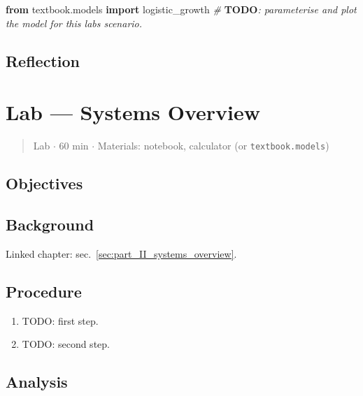 \documentclass[
]{article}
\newenvironment{Shaded}{}{}
\newcommand{\AlertTok}[1]{\textcolor[rgb]{1.00,0.00,0.00}{\textbf{#1}}}
\newcommand{\CommentTok}[1]{\textcolor[rgb]{0.38,0.63,0.69}{\textit{#1}}}
\newcommand{\ImportTok}[1]{\textcolor[rgb]{0.00,0.50,0.00}{\textbf{#1}}}
\newcommand{\NormalTok}[1]{#1}
\theoremstyle{plain}
\theoremstyle{definition}
\begin{document}
\begin{Shaded}
\begin{Highlighting}[]
\ImportTok{from}\NormalTok{ textbook.models }\ImportTok{import}\NormalTok{ logistic\_growth}
\CommentTok{\# }\AlertTok{TODO}\CommentTok{: parameterise and plot the model for this lab\textquotesingle{}s scenario.}
\end{Highlighting}
\end{Shaded}

\subsection{Reflection}\label{reflection-5}

\newpage

\section{Lab --- Systems
Overview}\label{sec:lab_part_II_systems_overview}

\begin{quote}
Lab \texorpdfstring{\ensuremath{\cdot}}{.} 60 min \texorpdfstring{\ensuremath{\cdot}}{.} Materials: notebook, calculator (or
\texttt{textbook.models})
\end{quote}

\subsection{Objectives}\label{objectives-6}

\subsection{Background}\label{background-6}

Linked chapter: sec.~\ref{sec:part_II_systems_overview}.

\subsection{Procedure}\label{procedure-6}

\begin{enumerate}
\def\labelenumi{\arabic{enumi}.}
\item
  TODO: first step.
\item
  TODO: second step.
\end{enumerate}

\subsection{Analysis}\label{analysis-6}
\end{document}

